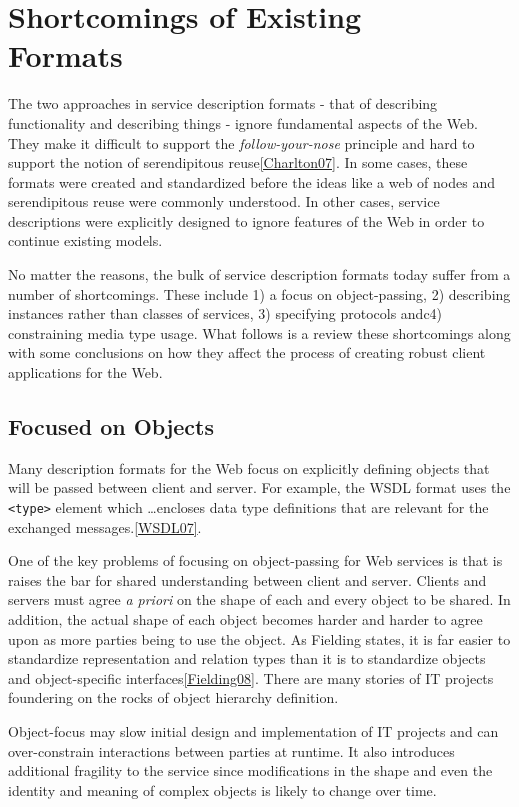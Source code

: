 \documentclass{wsrest2014}
\begin{document}
\section{Shortcomings of Existing\\Formats}
\label{_shortcomings_of_existing_formats}
 \par{}The two approaches in service description formats - that of describing functionality and describing things - ignore fundamental aspects of the Web. They make it difficult to support the \emph{follow-your-nose} principle and hard to support the notion of \textquotedbl{}serendipitous reuse\textquotedbl{}\hyperlink{Charlton07}{[Charlton07]}. In some cases, these formats were created and standardized before the ideas like \textquotedbl{}a web of nodes\textquotedbl{} and \textquotedbl{}serendipitous reuse\textquotedbl{} were commonly understood. In other cases, service descriptions were explicitly designed to ignore features of the Web in order to continue existing models.
 \par{}No matter the reasons, the bulk of service description formats today suffer from a number of shortcomings. These include 1) a focus on object-passing, 2) describing instances rather than classes of services, 3) specifying protocols andc4) constraining media type usage. What follows is a review these shortcomings along with some conclusions on how they affect the process of creating robust client applications for the Web.
\hypertarget{_focused_on_objects}{}
\subsection{Focused on Objects}
\label{_focused_on_objects}
 \par{}Many description formats for the Web focus on explicitly defining objects that will be passed between client and server. For example, the WSDL format uses the \texttt{\textless{}type\textgreater{}} element which \textquotedbl{}\dots{}encloses data type definitions that are relevant for the exchanged messages.\textquotedbl{}\hyperlink{WSDL07}{[WSDL07]}.
 \par{}One of the key problems of focusing on object-passing for Web services is that is raises the bar for shared understanding between client and server. Clients and servers must agree \emph{a priori} on the shape of each and every object to be shared. In addition, the actual shape of each object becomes harder and harder to agree upon as more parties being to use the object. As Fielding states, \textquotedbl{}it is far easier to standardize representation and relation types than it is to standardize objects and object-specific interfaces\textquotedbl{}\hyperlink{Fielding08}{[Fielding08]}. There are many stories of IT projects foundering on the rocks of object hierarchy definition.
 \par{}Object-focus may slow initial design and implementation of IT projects and can over-constrain interactions between parties at runtime. It also introduces additional fragility to the service since modifications in the shape and even the identity and meaning of complex objects is likely to change over time.
\hypertarget{_limited_to_instances}{}
\end{document}
